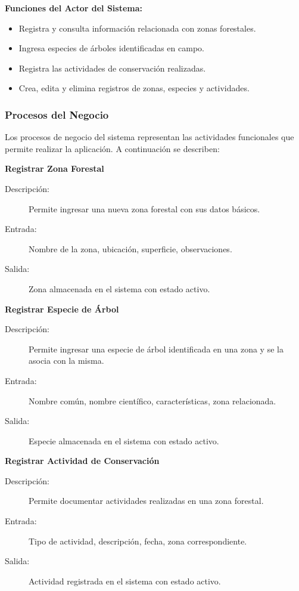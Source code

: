\textbf{Funciones del Actor del Sistema:}
\begin{itemize}
    \item Registra y consulta información relacionada con zonas forestales.
    \item Ingresa especies de árboles identificadas en campo.
    \item Registra las actividades de conservación realizadas.
    \item Crea, edita y elimina registros de zonas, especies y actividades.
\end{itemize}

\subsubsection{Procesos del Negocio}
Los procesos de negocio del sistema representan las actividades funcionales que permite realizar la aplicación. A continuación se describen:

\textbf{Registrar Zona Forestal}
\begin{description}
    \item[Descripción:] Permite ingresar una nueva zona forestal con sus datos básicos.
    \item[Entrada:] Nombre de la zona, ubicación, superficie, observaciones.
    \item[Salida:] Zona almacenada en el sistema con estado activo.
\end{description}

\textbf{Registrar Especie de Árbol}
\begin{description}
    \item[Descripción:] Permite ingresar una especie de árbol identificada en una zona y se la asocia con la misma.
    \item[Entrada:] Nombre común, nombre científico, características, zona relacionada.
    \item[Salida:] Especie almacenada en el sistema con estado activo.
\end{description}

\textbf{Registrar Actividad de Conservación}
\begin{description}
    \item[Descripción:] Permite documentar actividades realizadas en una zona forestal.
    \item[Entrada:] Tipo de actividad, descripción, fecha, zona correspondiente.
    \item[Salida:] Actividad registrada en el sistema con estado activo.
\end{description}

